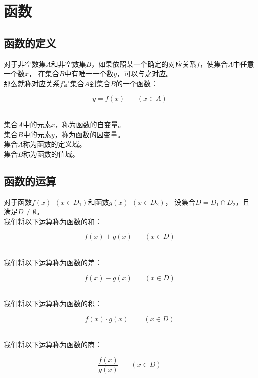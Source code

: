 \documentclass[UTF8]{ctexart}
\begin{document}
\newpage

\section{函数}

\subsection{函数的定义}
    对于非空数集$A$和非空数集$B$，如果依照某一个确定的对应关系$f$，使集合$A$中任意一个数$x$，
    在集合$B$中有唯一一个数$y$，可以与之对应。\\[3mm]
    那么就称对应关系$f$是集合$A$到集合$B$的一个函数：
    \begin{large}
        \begin{equation*}
            y=f(x)~~~~~~~~(x\in A)
        \end{equation*}
    \end{large}\\
    集合$A$中的元素$x$，称为函数的自变量。\\[3mm]
    集合$B$中的元素$y$，称为函数的因变量。\\[3mm]
    集合$A$称为函数的定义域。\\[3mm]
    集合$B$称为函数的值域。\\

\subsection{函数的运算}
    对于函数$f(x)~~(x\in D_1)$和函数$g(x)~~(x\in D_2)$，
    设集合$D=D_1\cap D_2$，且满足$D\neq\emptyset$。\\[3mm]
    我们将以下运算称为函数的和：
    \begin{large}
        \begin{equation*}
            f(x)+g(x)~~~~~~~~(x\in D)
        \end{equation*}
    \end{large}\\
    我们将以下运算称为函数的差：
    \begin{large}
        \begin{equation*}
            f(x)-g(x)~~~~~~~~(x\in D)
        \end{equation*}
    \end{large}\\
    我们将以下运算称为函数的积：
    \begin{large}
        \begin{equation*}
            f(x)\cdot g(x)~~~~~~~~~~(x\in D)
        \end{equation*}
    \end{large}\\
    我们将以下运算称为函数的商：\vspace{3pt}
    \begin{large}
        \begin{equation*}
            \frac{f(x)}{g(x)}~~~~~~~~(x\in D)
        \end{equation*}
    \end{large}\\
\end{document}
